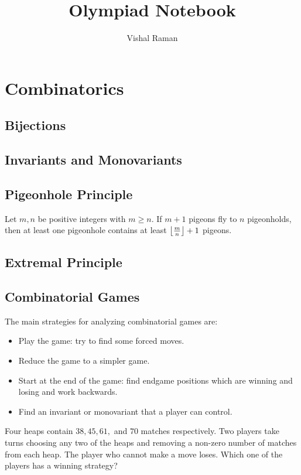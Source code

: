 \documentclass[11pt]{article}
\renewcommand{\>}{\rangle}
\newcommand{\<}{\langle}
\begin{document}
\title{Olympiad Notebook}
\author{Vishal Raman}
\maketitle
\begin{abstract}


\end{abstract}
\tableofcontents
\pagebreak
\section{Combinatorics}
\subsection{Bijections}

\subsection{Invariants and Monovariants}

\subsection{Pigeonhole Principle}
\begin{theorem} Let $m, n$ be positive integers with $m \ge n$.  If $m+1$ pigeons fly to $n$ pigeonholds, then at least one pigeonhole contains at least $\left\lfloor \frac{m}{n} \right\rfloor + 1$ pigeons.
\end{theorem}
\subsection{Extremal Principle}
\subsection{Combinatorial Games}
The main strategies for analyzing combinatorial games are:
\begin{itemize}
\item Play the game: try to find some forced moves.
\item Reduce the game to a simpler game.
\item Start at the end of the game: find endgame positions which are winning and losing and work backwards.
\item Find an invariant or monovariant that a player can control.  
\end{itemize}

\begin{problem} Four heaps contain $38, 45, 61,$ and $70$ matches respectively.  Two players take turns choosing any two of the heaps and removing a non-zero number of matches from each heap.  The player who cannot make a move loses. Which one of the players has a winning strategy?
\end{problem}
\end{document}
